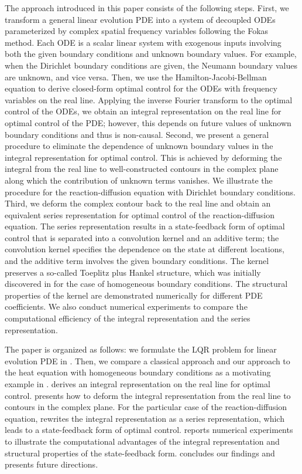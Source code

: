 \documentclass[journal,twoside,web]{ieeecolor}
\begin{document}
The approach introduced in this paper consists of the following steps. 
First, we transform a general linear evolution PDE into a system of decoupled ODEs parameterized by complex spatial frequency variables following the Fokas method.
Each ODE is a scalar linear system with exogenous inputs involving both the given boundary conditions and unknown boundary values. 
For example, when the Dirichlet boundary conditions are given, the Neumann boundary values are unknown, and vice versa.
Then, we use the Hamilton-Jacobi-Bellman equation to derive closed-form optimal control for the ODEs with frequency variables on the real line.
Applying the inverse Fourier transform to the optimal control of the ODEs, we obtain an integral representation on the real line for optimal control of the PDE; however, this depends on future values of unknown boundary conditions and thus is non-causal.
Second, we present a general procedure to eliminate the dependence of unknown boundary values in the integral representation for optimal control.
This is achieved by deforming the integral from the real line to well-constructed contours in the complex plane along which the contribution of unknown terms vanishes.
We illustrate the procedure for the reaction-diffusion equation with Dirichlet boundary conditions.
Third, we deform the complex contour back to the real line and obtain an equivalent series representation for optimal control of the reaction-diffusion equation.
The series representation results in a state-feedback form of optimal control that is separated into a convolution kernel and an additive term; the convolution kernel specifies the dependence on the state at different locations, and the additive term involves the given boundary conditions.
The kernel preserves a so-called Toeplitz plus Hankel structure, which was initially discovered in \cite{epperlein2016spatially} for the case of homogeneous boundary conditions.
The structural properties of the kernel are demonstrated numerically for different PDE coefficients.
We also conduct numerical experiments to compare the computational efficiency of the integral representation and the series representation.


The paper is organized as follows: we formulate the LQR problem for linear evolution PDE in .
Then, we compare a classical approach and our approach to the heat equation with homogeneous boundary conditions as a motivating example in . 
 derives an integral representation on the real line for optimal control. 
 presents
how to deform the integral representation from the real line to contours in the complex plane.
For the particular case of the reaction-diffusion equation,  rewrites the integral representation as a series representation, which leads to a state-feedback form of optimal control.
 reports numerical experiments to illustrate the computational advantages of the integral representation and structural properties of the state-feedback form. 
 concludes our findings and presents future directions.
\end{document}
